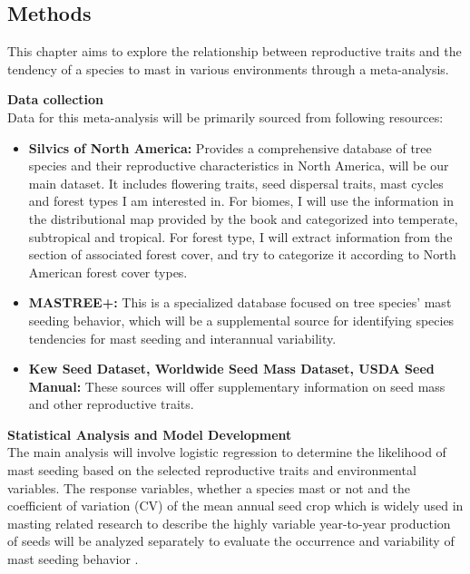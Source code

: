 \documentclass[11pt,letter]{article}
\begin{document}
\subsection{Methods}
This chapter aims to explore the relationship between reproductive traits and the tendency of a species to mast in various environments through a meta-analysis.\par
\textbf{Data collection}\\
Data for this meta-analysis will be primarily sourced from following resources:
	\begin{itemize}
	\item \textbf{Silvics of North America:} Provides a comprehensive database of tree species and their reproductive characteristics in North America, will be our main dataset. It includes flowering traits, seed dispersal traits, mast cycles and forest types I am interested in. For biomes, I will use the information in the distributional map provided by the book and categorized into temperate, subtropical and tropical. For forest type, I will extract information from the section of associated forest cover, and try to categorize it according to North American forest cover types.
	\item \textbf{MASTREE+:} This is a specialized database focused on tree species' mast seeding behavior, which will be a supplemental source for identifying species tendencies for mast seeding and interannual variability.
	\item \textbf{Kew Seed Dataset, Worldwide Seed Mass Dataset, USDA Seed Manual:} These sources will offer supplementary information on seed mass and other reproductive traits.
	\end{itemize}
\textbf{Statistical Analysis and Model Development}\\
The main analysis will involve logistic regression to determine the likelihood of mast seeding based on the selected reproductive traits and environmental variables. The response variables, whether a species mast or not and the coefficient of variation (CV) of the mean annual seed crop  which is widely used in masting related research to describe the highly variable year-to-year production of seeds will be analyzed separately to evaluate the occurrence and variability of mast seeding behavior \citep{kelly2002mast}.
\end{document}
